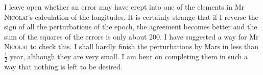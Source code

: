 \par{}I leave open whether an error may have crept into one of the elements in Mr \textsc{Nicolai}'s calculation of the longitudes. It is certainly strange that if I reverse the sign of all the perturbations of the epoch, the agreement becomes  better and the sum of the squares of the errors is only about 200. I have suggested a way for Mr \textsc{Nicolai} to check this. I shall hardly finish the perturbations by Mars in less than \(\frac{1}{2}\) year, although they are very small. I am bent on completing them in such a way that nothing is left to be desired.
\par
